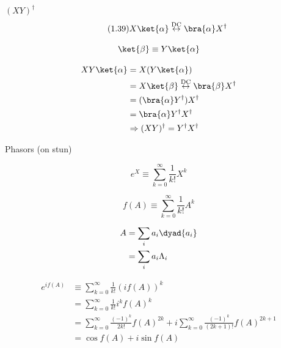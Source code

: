 \begin{answer}
\begin{answerpart}{\texorpdfstring{$(XY)^\dagger$}{Hermitian of XY}}
  \begin{equation}
    \tag{1.39}
    X\ket{\alpha} \overset{\text{DC}}{\leftrightarrow} \bra{\alpha}X^{\dagger}
  \end{equation}

  \begin{equation}
    \ket{\beta} \equiv Y\ket{\alpha}
  \end{equation}

  \begin{equation}
    \begin{split}
      XY\ket{\alpha}
      &= X(Y\ket{\alpha})\\
      &= X\ket{\beta} \overset{\text{DC}}{\leftrightarrow} \bra{\beta}X^{\dagger}\\
      &= (\bra{\alpha}Y^{\dagger})X^{\dagger}\\
      &= \bra{\alpha}Y^{\dagger}X^{\dagger}\\
      &\Rightarrow (XY)^{\dagger} = Y^{\dagger}X^{\dagger}
    \end{split}
  \end{equation}

\end{answerpart}



\begin{answerpart}{Phasors (on stun)}

  \begin{equation}
    e^X \equiv \sum_{k=0}^{\infty} \frac{1}{k!} X^k
  \end{equation}

  \begin{equation}
    f(A) \equiv \sum_{k=0}^{\infty} \frac{1}{k!} A^k
  \end{equation}

  \begin{equation}
    \begin{split}
      A
      &= \sum_i a_i\dyad{a_i} \\
      &= \sum_i a_i\Lambda_i \\
    \end{split}
  \end{equation}

  \begin{equation}
    \begin{split}
      e^{if(A)}
      &\equiv \sum_{k=0}^{\infty} \frac{1}{k!} (if(A))^k\\
      &= \sum_{k=0}^{\infty} \frac{1}{k!} i^kf(A)^k\\
      &= \sum_{k=0}^{\infty} \frac{(-1)^k}{2k!} f(A)^{2k} + i\sum_{k=0}^{\infty} \frac{(-1)^k}{(2k+1)!} f(A)^{2k+1}\\
      &= \cos{f(A)} + i\sin{f(A)}\\
    \end{split}
  \end{equation}


\end{answerpart}
\end{answer}
